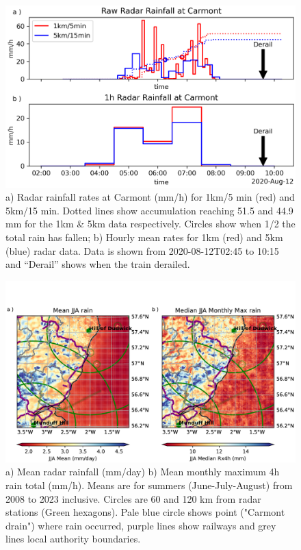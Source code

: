 \documentclass[11pt,a4paper]{article}
\begin{document}
\begin{figure}[tp]
	\centering
	\includegraphics[width=0.5\linewidth]{radar_carmont.png}
	\caption{a) Radar rainfall rates at Carmont (mm/h) for 1km/5 min (red) and 5km/15 min. Dotted lines show accumulation reaching 51.5 and 44.9 mm for the 1km \& 5km data respectively. Circles show when 1/2 the total rain has fallen; b) Hourly mean rates for 1km (red) and 5km (blue) radar data. Data is shown from 2020-08-12T02:45 to 10:15 and ``Derail'' shows when the train derailed. }
	\label{fig:aug2020_rain}
\end{figure}




\begin{figure}
	\centering
	\includegraphics[width=\linewidth]{radar_jja}
	\caption{a) Mean radar rainfall (mm/day) b) Mean monthly maximum 4h rain total (mm/h). Means are for summers (June-July-August) from 2008 to 2023 inclusive. Circles are  60 and 120 km from radar stations (Green hexagons). Pale blue circle shows point ("Carmont drain") where rain occurred, purple lines show railways and grey lines local authority boundaries. }
	\label{fig:mean_rain}
\end{figure}
\end{document}
